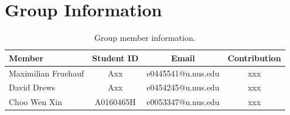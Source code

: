 \documentclass[11pt]{article}
\begin{document}
\section{Group Information}
\begin{table}[ht]
    \centering
    \begin{tabular}{lccc}
    \toprule
     Member & Student ID & Email & Contribution\\
    \midrule
    Maximilian Fruehauf& Axx & e0445541@u.nus.edu & xxx \\
    David Drews& Axx &e0454245@u.nus.edu & xxx  \\
    Choo Wen Xin& A0160465H & e0053347@u.nus.edu & xxx  \\
    \bottomrule
    \end{tabular}
    \caption{Group member information.}
    \label{tab:dataset}
\end{table}




 
\end{document}
